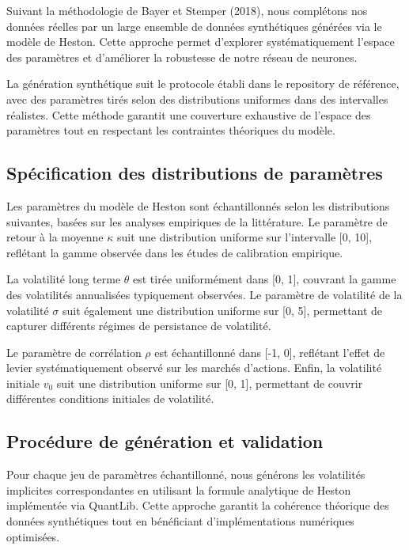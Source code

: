 Suivant la méthodologie de Bayer et Stemper (2018), nous complétons nos données réelles par un large ensemble de données synthétiques générées via le modèle de Heston. Cette approche permet d'explorer systématiquement l'espace des paramètres et d'améliorer la robustesse de notre réseau de neurones.

La génération synthétique suit le protocole établi dans le repository de référence, avec des paramètres tirés selon des distributions uniformes dans des intervalles réalistes. Cette méthode garantit une couverture exhaustive de l'espace des paramètres tout en respectant les contraintes théoriques du modèle.

\subsection{Spécification des distributions de paramètres}

Les paramètres du modèle de Heston sont échantillonnés selon les distributions suivantes, basées sur les analyses empiriques de la littérature. Le paramètre de retour à la moyenne $\kappa$ suit une distribution uniforme sur l'intervalle [0, 10], reflétant la gamme observée dans les études de calibration empirique.

La volatilité long terme $\theta$ est tirée uniformément dans [0, 1], couvrant la gamme des volatilités annualisées typiquement observées. Le paramètre de volatilité de la volatilité $\sigma$ suit également une distribution uniforme sur [0, 5], permettant de capturer différents régimes de persistance de volatilité.

Le paramètre de corrélation $\rho$ est échantillonné dans [-1, 0], reflétant l'effet de levier systématiquement observé sur les marchés d'actions. Enfin, la volatilité initiale $v_0$ suit une distribution uniforme sur [0, 1], permettant de couvrir différentes conditions initiales de volatilité.

\subsection{Procédure de génération et validation}

Pour chaque jeu de paramètres échantillonné, nous générons les volatilités implicites correspondantes en utilisant la formule analytique de Heston implémentée via QuantLib. Cette approche garantit la cohérence théorique des données synthétiques tout en bénéficiant d'implémentations numériques optimisées.

